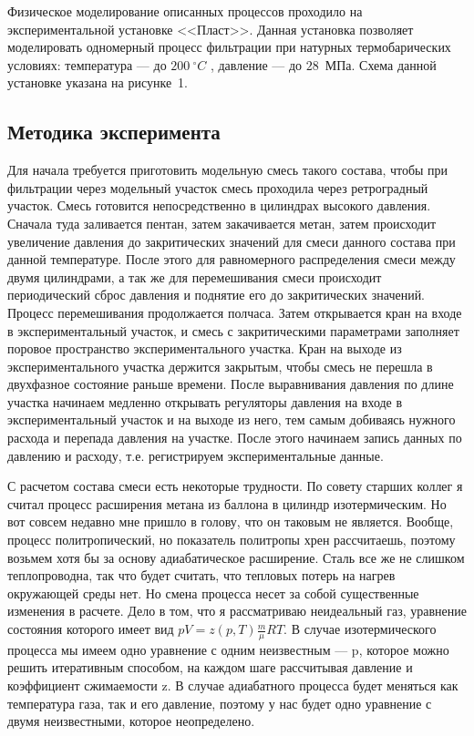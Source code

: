 \documentclass[a4paper,14pt]{article}
\theoremstyle{plain} %
\theoremstyle{definition} %
\theoremstyle{remark} %
\begin{document}
Физическое моделирование описанных процессов проходило на экспериментальной установке <<Пласт>>. Данная установка позволяет моделировать одномерный процесс фильтрации при натурных термобарических условиях: температура --- до $200~^{\circ}C$ , давление --- до $28$~МПа. Схема данной установке указана на рисунке~1.

\subsection{Методика эксперимента}
 
Для начала требуется приготовить модельную смесь такого состава, чтобы при фильтрации через модельный участок смесь проходила через ретроградный участок. Смесь готовится непосредственно в цилиндрах высокого давления. Сначала туда заливается пентан, затем закачивается метан, затем происходит увеличение давления до закритических значений для смеси данного состава при данной температуре. После этого для равномерного распределения смеси между двумя цилиндрами, а так же для перемешивания смеси происходит периодический сброс давления и поднятие его до закритических значений. Процесс перемешивания продолжается полчаса. Затем открывается кран на входе в экспериментальный участок, и смесь с закритическими параметрами заполняет поровое пространство экспериментального участка. Кран на выходе из экспериментального участка держится закрытым, чтобы смесь не перешла в двухфазное состояние раньше времени. После выравнивания давления по длине участка начинаем медленно открывать регуляторы давления на входе в экспериментальный участок и на выходе из него, тем самым добиваясь нужного расхода и перепада давления на участке. После этого начинаем запись данных по давлению и расходу, т.е. регистрируем экспериментальные данные. 

С расчетом состава смеси есть некоторые трудности. По совету старших коллег я считал процесс расширения метана из баллона в цилиндр изотермическим. Но вот совсем недавно мне пришло в голову, что он таковым не является. Вообще, процесс политропический, но показатель политропы хрен рассчитаешь, поэтому возьмем хотя бы за основу адиабатическое расширение. Сталь все же не слишком теплопроводна, так что будет считать, что тепловых потерь на нагрев окружающей среды нет. Но смена процесса несет за собой существенные изменения в расчете. Дело в том, что я рассматриваю неидеальный газ, уравнение состояния которого имеет вид $pV = z(p,T)\frac{m}{\mu}RT$. В случае изотермического процесса мы имеем одно уравнение с одним неизвестным --- p, которое можно решить итеративным способом, на каждом шаге рассчитывая давление и коэффициент сжимаемости z. В случае адиабатного процесса будет меняться как температура газа, так и его давление, поэтому у нас будет одно уравнение с двумя неизвестными, которое неопределено. 
\end{document}
